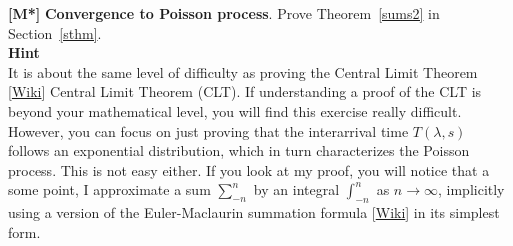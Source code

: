 \documentclass[10pt]{article}
\begin{document}
\begin{Exercise}\label{exercise3}
{\bf [M*]} {\bf Convergence to Poisson process}. Prove Theorem~\ref{sums2} in Section~\ref{sthm}.\vspace{1ex} \\
{\bf Hint} \vspace{1ex} \\
It is about the same level of difficulty as proving the 
\textcolor{index}{Central Limit Theorem} [\href{https://en.wikipedia.org/wiki/Central_limit_theorem}{Wiki}] 
Central Limit Theorem (CLT). If understanding a proof of the CLT is beyond your mathematical level, you will find this exercise really difficult. However, you can focus on just proving that the interarrival time $T(\lambda,s)$ follows an exponential distribution, which in turn characterizes the Poisson process. This is not easy either. If you look at my proof, you will notice that a some point, I approximate a sum $\sum_{-n}^n$ by an integral $\int_{-n}^n$ as $n\rightarrow\infty$, implicitly using a version of the Euler-Maclaurin summation formula [\href{https://bit.ly/3m7FxKA}{Wiki}] in its simplest form. 
\end{Exercise}
\end{document}
